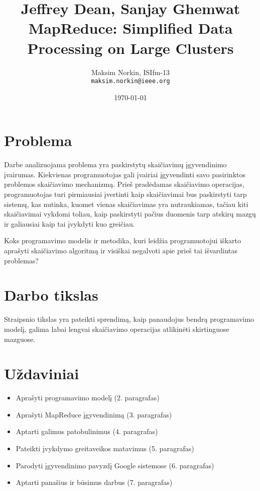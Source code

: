 \documentclass[10pt, onecolumn]{IEEEtran}
\author{Maksim Norkin, ISIfm-13\\ \texttt{maksim.norkin@ieee.org}}
\title{Jeffrey Dean, Sanjay Ghemwat\\MapReduce: Simplified Data Processing on Large Clusters}
\date{\today}
\begin{document}
	\maketitle

	\section{Problema}

		Darbe analizuojama problema yra paskirstytų skaičiavimų įgyvendinimo įvairumas. Kiekvienas programuotojas gali įvairiai įgyvendinti savo pasirinktos problemos skaičiavimo mechanizmą. Prieš pradėdamas skaičiavimo operacijas, programuotojas turi pirmiausiai įvertinti kaip skaičiavimai bus paskirstyti tarp sistemų, kas nutinka, kuomet vienas skaičiavimas yra nutraukiamas, tačiau kiti skaičiavimai vykdomi toliau, kaip paskirstyti pačius duomenis tarp atskirų mazgų ir galiausiai kaip tai įvykdyti kuo greičiau.

		Koks programavimo modelis ir metodika, kuri leidžia programuotojui iškarto aprašyti skaičiavimo algoritmą ir visiškai negalvoti apie prieš tai išvardintas problemas?

	\section{Darbo tikslas}

		Straipsnio tikslas yra pateikti sprendimą, kaip panaudojus bendrą programavimo modelį, galima labai lengvai skaičiavimo operacijas atlikinėti skirtinguose mazguose.

	\section{Uždaviniai}

		\begin{itemize}
	      \item Aprašyti programavimo modelį (2. paragrafas)
	      \item Aprašyti MapReduce įgyvendinimą (3. paragrafas)
	      \item Aptarti galimus patobulinimus (4. paragrafas)
	      \item Pateikti įvykdymo greitaveikos matavimus (5. paragrafas)
	      \item Parodyti įgyvendinimo pavyzdį Google sistemose (6. paragrafas)
	      \item Aptarti panašius ir būsimus darbus (7. paragrafas)
	    \end{itemize}
\end{document}
